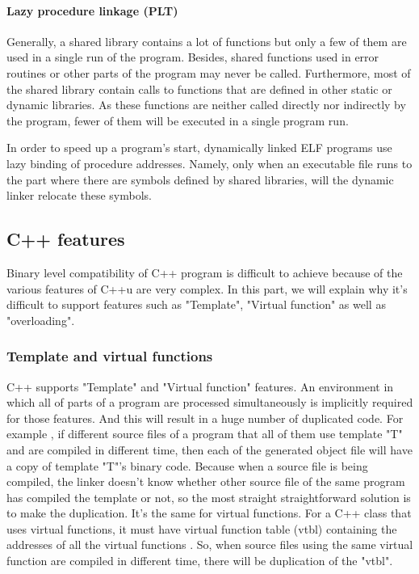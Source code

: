         
        \paragraph{Lazy procedure linkage (PLT)}
        Generally, a shared library contains a lot of functions but only a few of them are used in a single run of the program\cite{LAL-00}. Besides, shared functions used in error routines or other parts of the program may never be called\cite{LAL-00}. Furthermore, most of the shared library contain calls to functions that are defined in other static or dynamic libraries. As these functions are neither called directly nor indirectly by the program, fewer of them will be executed in a single program run\cite{LAL-00}.
                
        In order to speed up a program's start, dynamically linked ELF programs use lazy binding of procedure addresses\cite{LAL-00}. Namely, only when an executable file runs to the part where there are symbols defined by shared libraries, will the dynamic linker relocate these symbols.
        
        
        
    
    \subsection{C++ features}
        Binary level compatibility of C++ program is difficult to achieve because of the various features of C++u are very complex. In this part, we will explain why it's difficult to support features such as "Template", "Virtual function" as well as "overloading". 
        
        \subsubsection{Template and virtual functions}
        C++ supports "Template" and "Virtual function" features. An environment in which all of parts of a program are processed simultaneously is implicitly required for those features\cite{LAL-00}. And this will result in a huge number of duplicated code. For example , if different source files of a program that all of them use template "T" and are compiled in different time, then each of the generated object file will have a copy of template "T"'s binary code. Because when a source file is being compiled, the linker doesn't know whether other source file of the same program has compiled the template or not, so the most straight straightforward solution is to make the duplication. It's the same for virtual functions. For a C++ class that uses virtual functions, it must have virtual function table (vtbl) containing the addresses of all the virtual functions \cite{LAL-00}. So, when source files using the same virtual function are compiled in different time, there will be duplication of the "vtbl". 
        

